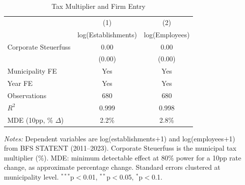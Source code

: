 \begin{table}[htbp]
\centering
\caption{Tax Multiplier and Firm Entry}
\label{tab:mechanism}
\begin{tabular}{lcc}
\hline\hline
& (1) & (2) \\
& log(Establishments) & log(Employees) \\
\hline
Corporate Steuerfuss & 0.00 & 0.00 \\
& (0.00) & (0.00) \\
\hline
Municipality FE & Yes & Yes \\
Year FE & Yes & Yes \\
Observations & 680 & 680 \\
$R^2$ & 0.999 & 0.998 \\
MDE (10pp, \% $\Delta$) & 2.2\% & 2.8\% \\
\hline\hline
\end{tabular}
\begin{tablenotes}\small
\item \textit{Notes:} Dependent variables are log(establishments$+$1) and log(employees$+$1) from BFS STATENT (2011--2023). Corporate Steuerfuss is the municipal tax multiplier (\%). MDE: minimum detectable effect at 80\% power for a 10pp rate change, as approximate percentage change. Standard errors clustered at municipality level. $^{***}$p$<$0.01, $^{**}$p$<$0.05, $^{*}$p$<$0.1.
\end{tablenotes}
\end{table}
